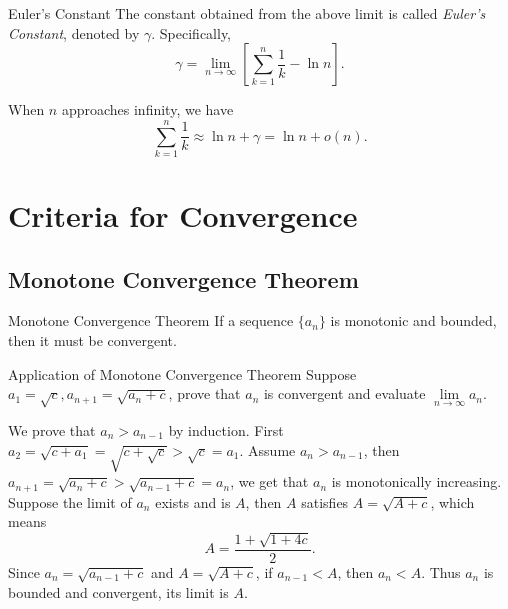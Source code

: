 \begin{definition}{Euler's Constant}{}
  The constant obtained from the above limit is called \emph{Euler's Constant},
  denoted by $\gamma$. Specifically,
  \begin{equation}
    \gamma = \lim \limits _{n \rightarrow \infty} \left[ \sum\limits_{k = 1}^n \frac{1}{k} - \ln n \right].
  \end{equation}
\end{definition}

\begin{corollary}{}{}
  When $n$ approaches infinity, we have
  \begin{equation}
    \sum\limits_{k = 1}^n \frac{1}{k} \approx \ln n + \gamma = \ln n + o(n).
  \end{equation}
\end{corollary}

\section{Criteria for Convergence}

\subsection{Monotone Convergence Theorem}

\begin{theorem}{Monotone Convergence Theorem}{}
  If a sequence $\{a_n\}$ is monotonic and bounded,
  then it must be convergent.
\end{theorem}

\begin{example}{Application of Monotone Convergence Theorem}{}
  Suppose $a_1 = \sqrt{c}, a_{n+1} = \sqrt{a_n + c}$,
  prove that $a_n$ is convergent and
  evaluate $\lim \limits _{n \rightarrow \infty} a_n$.
\end{example}

\begin{solution}
  We prove that $a_n > a_{n-1}$ by induction.
  First $a_2 = \sqrt{c + a_1} = \sqrt{c + \sqrt{c}} > \sqrt{c} = a_1$.
  Assume $a_n > a_{n-1}$, then $a_{n+1} = \sqrt{a_n + c} > \sqrt{a_{n-1} + c} =
  a_n$, we get that $a_n$ is monotonically increasing.
  Suppose the limit of $a_n$ exists and is $A$, then $A$ satisfies $A = \sqrt{A
    + c}$, which means
  \begin{equation}
    A = \frac{1 + \sqrt{1 + 4c}}{2}.
  \end{equation}
  Since $a_n = \sqrt{a_{n-1} + c}$ and $A = \sqrt{A + c}$, if $a_{n-1} < A$,
  then $a_n < A$.
  Thus $a_n$ is bounded and convergent, its limit is $A$.
\end{solution}

